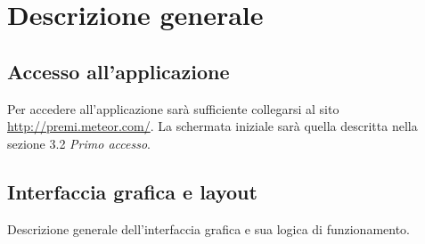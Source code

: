 \section{Descrizione generale}

\subsection{Accesso all'applicazione}
Per accedere all'applicazione sarà sufficiente collegarsi al sito \href{http://premi.meteor.com/}{http://premi.meteor.com/}. La schermata iniziale sarà quella descritta nella sezione 3.2 \emph{Primo accesso}.

\subsection{Interfaccia grafica e layout}
Descrizione generale dell'interfaccia grafica e sua logica di funzionamento.
